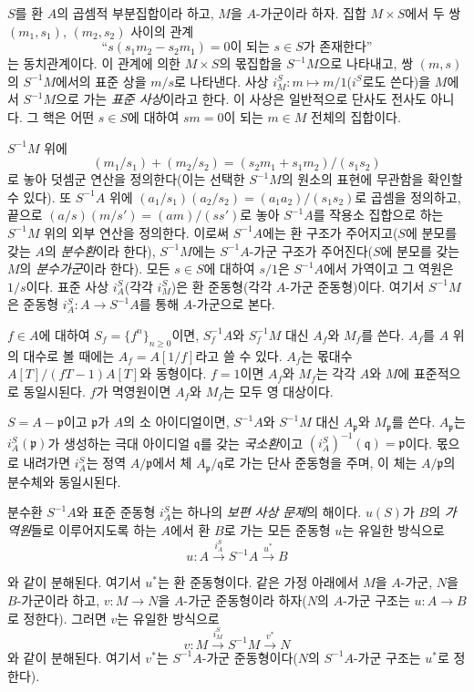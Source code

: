 \begin{env}[1.2.2]
\label{0.1.2.2-ko}
$S$를 환 $A$의 곱셈적 부분집합이라 하고, $M$을 $A$-가군이라 하자. 집합 $M\times S$에서 두 쌍 $(m_1,s_1)$, $(m_2,s_2)$ 사이의 관계
\[
  \text{``$s(s_1m_2-s_2m_1)=0$이 되는 $s\in S$가 존재한다''}
\]
는 동치관계이다.
이 관계에 의한 $M\times S$의 몫집합을 $S^{-1}M$으로 나타내고, 쌍 $(m,s)$의 $S^{-1}M$에서의 표준 상을 $m/s$로 나타낸다. 사상 $i_M^S:m\mapsto m/1$($i^S$로도 쓴다)을 $M$에서 $S^{-1}M$으로 가는 \emph{표준 사상}이라고 한다.
이 사상은 일반적으로 단사도 전사도 아니다. 그 핵은 어떤 $s\in S$에 대하여 $sm=0$이 되는 $m\in M$ 전체의 집합이다.

$S^{-1}M$ 위에
\[
  (m_1/s_1)+(m_2/s_2)=(s_2m_1+s_1m_2)/(s_1s_2)
\]
로 놓아 덧셈군 연산을 정의한다(이는 선택한 $S^{-1}M$의 원소의 표현에 무관함을 확인할 수 있다).
또 $S^{-1}A$ 위에 $(a_1/s_1)(a_2/s_2)=(a_1a_2)/(s_1s_2)$로 곱셈을 정의하고, 끝으로 $(a/s)(m/s')=(am)/(ss')$로 놓아 $S^{-1}A$를 작용소 집합으로 하는 $S^{-1}M$ 위의 외부 연산을 정의한다.
이로써 $S^{-1}A$에는 환 구조가 주어지고($S$에 분모를 갖는 $A$의 \emph{분수환}이라 한다), $S^{-1}M$에는 $S^{-1}A$-가군 구조가 주어진다($S$에 분모를 갖는 $M$의 \emph{분수가군}이라 한다). 모든 $s\in S$에 대하여 $s/1$은 $S^{-1}A$에서 가역이고 그 역원은 $1/s$이다.
표준 사상 $i_A^S$(각각 $i_M^S$)은 환 준동형(각각 $A$-가군 준동형)이다. 여기서 $S^{-1}M$은 준동형 $i_A^S:A\to S^{-1}A$를 통해 $A$-가군으로 본다.
\end{env}

\begin{env}[1.2.3]
\label{0.1.2.3-ko}
$f\in A$에 대하여 $S_f=\{f^n\}_{n\geq 0}$이면, $S_f^{-1}A$와 $S_f^{-1}M$ 대신 $A_f$와 $M_f$를 쓴다. $A_f$를 $A$ 위의 대수로 볼 때에는 $A_f=A[1/f]$라고 쓸 수 있다.
$A_f$는 몫대수 $A[T]/(fT-1)A[T]$와 동형이다.
$f=1$이면 $A_f$와 $M_f$는 각각 $A$와 $M$에 표준적으로 동일시된다. $f$가 멱영원이면 $A_f$와 $M_f$는 모두 영 대상이다.

$S=A-\mathfrak{p}$이고 $\mathfrak{p}$가 $A$의 소 아이디얼이면, $S^{-1}A$와 $S^{-1}M$ 대신 $A_{\mathfrak{p}}$와 $M_{\mathfrak{p}}$를 쓴다. $A_{\mathfrak{p}}$는 $i_A^S(\mathfrak{p})$가 생성하는 극대 아이디얼 $\mathfrak{q}$를 갖는 \emph{국소환}이고 $(i_A^S)^{-1}(\mathfrak{q})=\mathfrak{p}$이다. 몫으로 내려가면 $i_A^S$는 정역 $A/\mathfrak{p}$에서 체 $A_{\mathfrak{p}}/\mathfrak{q}$로 가는 단사 준동형을 주며, 이 체는 $A/\mathfrak{p}$의 분수체와 동일시된다.
\end{env}

\begin{env}[1.2.4]
\label{0.1.2.4-ko}
분수환 $S^{-1}A$와 표준 준동형 $i_A^S$는 하나의 \emph{보편 사상 문제}의 해이다. $u(S)$가 $B$의 \emph{가역원}들로 이루어지도록 하는 $A$에서 환 $B$로 가는 모든 준동형 $u$는 유일한 방식으로
\[
  u:A\xrightarrow{i_A^S}S^{-1}A\xrightarrow{u^*}B
\]

와 같이 분해된다. 여기서 $u^*$는 환 준동형이다.
같은 가정 아래에서 $M$을 $A$-가군, $N$을 $B$-가군이라 하고, $v:M\to N$을 $A$-가군 준동형이라 하자($N$의 $A$-가군 구조는 $u:A\to B$로 정한다). 그러면 $v$는 유일한 방식으로
\[
  v:M\xrightarrow{i_M^S}S^{-1}M\xrightarrow{v^*}N
\]
와 같이 분해된다. 여기서 $v^*$는 $S^{-1}A$-가군 준동형이다($N$의 $S^{-1}A$-가군 구조는 $u^*$로 정한다).
\end{env}

